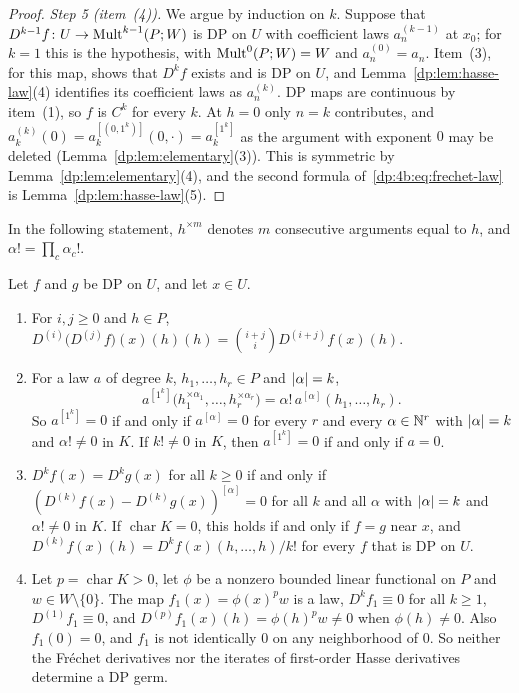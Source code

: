 \begin{proof}
\emph{Step 5 (item~(4)).} We argue by induction on $k$. Suppose that $D^{k-1}f\colon U\to\operatorname{Mult}^{k-1}(P;W)$ is DP on $U$ with coefficient laws $a_n^{(k-1)}$ at $x_0$; for $k=1$ this is the hypothesis, with $\operatorname{Mult}^0(P;W)=W$ and $a_n^{(0)}=a_n$. Item~(3), for this map, shows that $D^kf$ exists and is DP on $U$, and Lemma~\ref{dp:lem:hasse-law}(4) identifies its coefficient laws as $a_n^{(k)}$. DP maps are continuous by item~(1), so $f$ is $C^k$ for every $k$. At $h=0$ only $n=k$ contributes, and $a_k^{(k)}(0)=a_k^{[(0,1^k)]}(0,\cdot)=a_k^{[1^k]}$ as the argument with exponent $0$ may be deleted (Lemma~\ref{dp:lem:elementary}(3)). This is symmetric by Lemma~\ref{dp:lem:elementary}(4), and the second formula of~\eqref{dp:4b:eq:frechet-law} is Lemma~\ref{dp:lem:hasse-law}(5).
\end{proof}

In the following statement, $h^{\times m}$ denotes $m$ consecutive arguments equal to $h$, and $\alpha!=\prod_c\alpha_c!$.

\begin{proposition}\label{dp:prop:frechet-hasse}
Let $f$ and $g$ be DP on $U$, and let $x\in U$.
\begin{enumerate}
\item For $i,j\ge0$ and $h\in P$, $D^{(i)}\bigl(D^{(j)}f\bigr)(x)(h)(h)=\binom{i+j}iD^{(i+j)}f(x)(h)$.
\item For a law $a$ of degree $k$, $h_1,\dots,h_r\in P$ and $\lvert \alpha\rvert=k$,
\begin{equation}\label{dp:4b:eq:full-polarization}
 a^{[1^k]}\bigl(h_1^{\times\alpha_1},\dots,h_r^{\times\alpha_r}\bigr)=\alpha!\,a^{[\alpha]}(h_1,\dots,h_r).
\end{equation}
So $a^{[1^k]}=0$ if and only if $a^{[\alpha]}=0$ for every $r$ and every $\alpha\in\mathbb N^r$ with $\lvert \alpha\rvert=k$ and $\alpha!\ne0$ in $K$. If $k!\ne0$ in $K$, then $a^{[1^k]}=0$ if and only if $a=0$.
\item $D^kf(x)=D^kg(x)$ for all $k\ge0$ if and only if $(D^{(k)}f(x)-D^{(k)}g(x))^{[\alpha]}=0$ for all $k$ and all $\alpha$ with $\lvert \alpha\rvert=k$ and $\alpha!\ne0$ in $K$. If $\operatorname{char}K=0$, this holds if and only if $f=g$ near $x$, and $D^{(k)}f(x)(h)=D^kf(x)(h,\dots,h)/k!$ for every $f$ that is DP on $U$.
\item Let $p=\operatorname{char}K>0$, let $\phi$ be a nonzero bounded linear functional on $P$ and $w\in W\setminus\{0\}$. The map $f_1(x)=\phi(x)^pw$ is a law, $D^kf_1\equiv0$ for all $k\ge1$, $D^{(1)}f_1\equiv0$, and $D^{(p)}f_1(x)(h)=\phi(h)^pw\ne0$ when $\phi(h)\ne0$. Also $f_1(0)=0$, and $f_1$ is not identically $0$ on any neighborhood of $0$. So neither the Fr\'echet derivatives nor the iterates of first-order Hasse derivatives determine a DP germ.
\end{enumerate}
\end{proposition}

